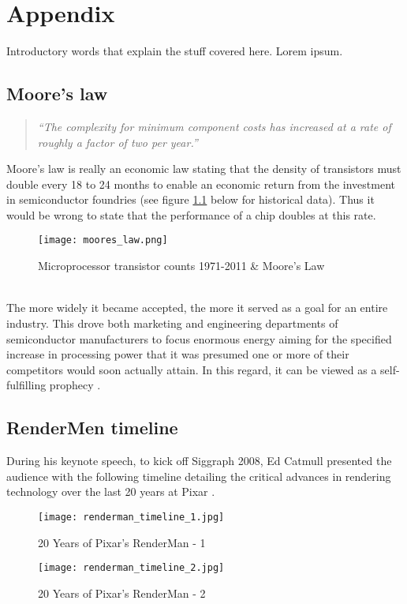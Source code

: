 \chapter{Appendix}
\label{appendix0}

Introductory words that explain the stuff covered here.
Lorem ipsum.

\newpage
\vspace*{1ex}
\section{Moore's law}
\label{appendix1}

\begin{quote} \textit{``The complexity for minimum component costs has increased at a rate of roughly a factor of two per year.''} \citep[p.115]{Moore1965} \end{quote}
Moore’s law is really an economic law stating that the density of transistors must double every 18 to 24 months to enable an economic return from the investment in semiconductor foundries (see figure \ref{fig:moores_law} below for historical data).
Thus it would be wrong to state that the performance of a chip doubles at this rate.
\begin{figure}[ht]
\centering
\texttt{[image: moores\_law.png]}
\caption{Microprocessor transistor counts 1971-2011 \& Moore's Law}
\label{fig:moores_law}
\end{figure}\\
The more widely it became accepted, the more it served as a goal for an entire industry.
This drove both marketing and engineering departments of semiconductor manufacturers to focus enormous energy aiming for the specified increase in processing power that it was presumed one or more of their competitors would soon actually attain.
In this regard, it can be viewed as a self-fulfilling prophecy \citep[cf.][]{Paul2006, Crvelin2012}.


\newpage
\section{RenderMen timeline}
\label{appendix2}

During his keynote speech, to kick off Siggraph 2008, Ed Catmull presented the audience with the following timeline detailing the critical advances in rendering technology over the last 20 years at Pixar \citep[cf.][]{Seymour2008}.
\begin{figure}[ht]
\centering
\texttt{[image: renderman\_timeline\_1.jpg]}
\caption{20 Years of Pixar's RenderMan - 1}
\label{fig:renderman_timeline_1}
\end{figure}
\begin{figure}[ht]
\centering
\texttt{[image: renderman\_timeline\_2.jpg]}
\caption{20 Years of Pixar's RenderMan - 2}
\label{fig:renderman_timeline_2}
\end{figure}


